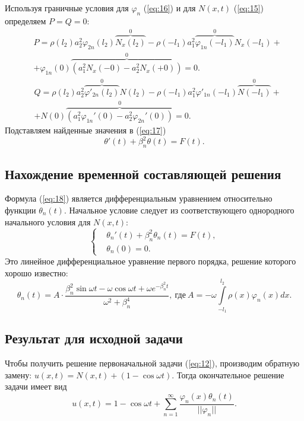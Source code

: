 \documentclass[12pt, a4paper]{article}
\begin{document}
Используя граничные условия для $\varphi_n$ (\ref{eq:16}) и для $N(x,t)$ (\ref{eq:15}) определяем $P=Q=0$:
\begin{equation}
  \begin{aligned}
  & P = \rho(l_2) a_2^2 \varphi_{2n}(l_2) \overbrace{N_x(l_2)}^0 - \rho(-l_1) a_1^2 \overbrace{\varphi_{1n}(-l_1)}^0 N_x(-l_1) + \\
  & + \varphi_{1n}(0)\overbrace{(a_1^2 N_x(-0) - a_2^2 N_x(+0))}^0 = 0.
\end{aligned}
\end{equation}
\begin{equation}
  \begin{aligned}
    & Q = \rho(l_2) a_2^2 \overbrace{\varphi'_{2n}(l_2)}^0 N(l_2) - \rho(-l_1) a_1^2 \varphi'_{1n}(-l_1) \overbrace{N(-l_1)}^0 + \\
    & + N(0)\overbrace{(a_1^2 \varphi_{1n}'(0) - a_2^2 \varphi_{2n}'(0))}^0 = 0.
\end{aligned}
\end{equation}
Подставляем найденные значения в (\ref{eq:17})
\begin{equation}
\theta'(t) + \beta_n^2 \theta(t) = F(t).
\label{eq:18}
\end{equation}
\subsection{Нахождение временной составляющей решения}
Формула (\ref{eq:18}) является дифференциальным уравнением относительно функции $\theta_n(t)$. Начальное условие следует из соответствующего однородного начального условия для $N(x,t)$:
\begin{equation}
  \left\{  
  \begin{aligned}
    & \theta_n'(t) + \beta_n^2 \theta_n(t) = F(t), \\
    & \theta_n (0) = 0.
  \end{aligned}
  \right.
\end{equation}
Это линейное дифференциальное уравнение первого порядка, решение которого хорошо известно:
\begin{equation}
  \theta_n(t) = A\cdot\frac{\beta_n^2 \sin \omega t - \omega \cos \omega t + \omega e^{-\beta_n^2 t}}{\omega^2 + \beta_n^4},\ \text{где}\ A=-\omega\int\limits_{-l_1}^{l_2}\rho(x)\varphi_n(x)dx.
\end{equation}
\subsection{Результат для исходной задачи}
Чтобы получить решение первоначальной задачи (\ref{eq:12}), производим обратную замену: $u(x,t) = N(x,t) + (1 - \cos \omega t)$. Тогда окончательное решение задачи имеет вид
\begin{equation}
  u(x,t)= 1 - \cos \omega t + \sum \limits_{n=1}^{\infty} \frac{\varphi_n(x) \theta_n(t)}{||\varphi_n||}.
\end{equation}
\end{document}
